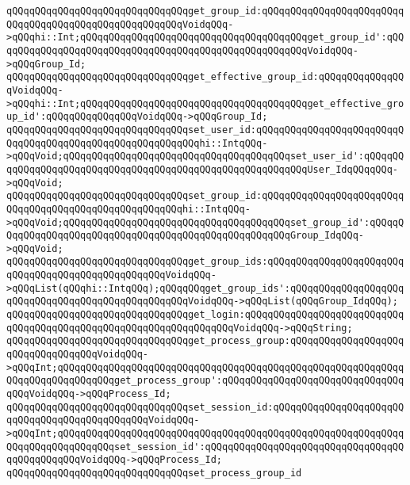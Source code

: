 \verb|qQQqqQQqqQQqqQQqqQQqqQQqqQQqqQQqget_group_id:qQQqqQQqqQQqqQQqqQQqqQQqqQQqqQQqqQQqqQQqqQQqqQQqqQQqqQQqVoidqQQq->qQQqhi::Int;qQQqqQQqqQQqqQQqqQQqqQQqqQQqqQQqqQQqqQQqget_group_id':qQQqqQQqqQQqqQQqqQQqqQQqqQQqqQQqqQQqqQQqqQQqqQQqqQQqqQQqVoidqQQq->qQQqGroup_Id;|\newline
\verb|qQQqqQQqqQQqqQQqqQQqqQQqqQQqqQQqget_effective_group_id:qQQqqQQqqQQqqQQqVoidqQQq->qQQqhi::Int;qQQqqQQqqQQqqQQqqQQqqQQqqQQqqQQqqQQqqQQqget_effective_group_id':qQQqqQQqqQQqqQQqVoidqQQq->qQQqGroup_Id;|\newline
\newline
\verb|qQQqqQQqqQQqqQQqqQQqqQQqqQQqqQQqset_user_id:qQQqqQQqqQQqqQQqqQQqqQQqqQQqqQQqqQQqqQQqqQQqqQQqqQQqqQQqqQQqhi::IntqQQq->qQQqVoid;qQQqqQQqqQQqqQQqqQQqqQQqqQQqqQQqqQQqqQQqset_user_id':qQQqqQQqqQQqqQQqqQQqqQQqqQQqqQQqqQQqqQQqqQQqqQQqqQQqqQQqqQQqUser_IdqQQqqQQq->qQQqVoid;|\newline
\verb|qQQqqQQqqQQqqQQqqQQqqQQqqQQqqQQqset_group_id:qQQqqQQqqQQqqQQqqQQqqQQqqQQqqQQqqQQqqQQqqQQqqQQqqQQqqQQqhi::IntqQQq->qQQqVoid;qQQqqQQqqQQqqQQqqQQqqQQqqQQqqQQqqQQqqQQqset_group_id':qQQqqQQqqQQqqQQqqQQqqQQqqQQqqQQqqQQqqQQqqQQqqQQqqQQqqQQqGroup_IdqQQq->qQQqVoid;|\newline
\newline
\verb|qQQqqQQqqQQqqQQqqQQqqQQqqQQqqQQqget_group_ids:qQQqqQQqqQQqqQQqqQQqqQQqqQQqqQQqqQQqqQQqqQQqqQQqqQQqVoidqQQq->qQQqList(qQQqhi::IntqQQq);qQQqqQQqget_group_ids':qQQqqQQqqQQqqQQqqQQqqQQqqQQqqQQqqQQqqQQqqQQqqQQqqQQqVoidqQQq->qQQqList(qQQqGroup_IdqQQq);|\newline
\newline
\verb|qQQqqQQqqQQqqQQqqQQqqQQqqQQqqQQqget_login:qQQqqQQqqQQqqQQqqQQqqQQqqQQqqQQqqQQqqQQqqQQqqQQqqQQqqQQqqQQqqQQqqQQqVoidqQQq->qQQqString;|\newline
\newline
\verb|qQQqqQQqqQQqqQQqqQQqqQQqqQQqqQQqget_process_group:qQQqqQQqqQQqqQQqqQQqqQQqqQQqqQQqqQQqVoidqQQq->qQQqInt;qQQqqQQqqQQqqQQqqQQqqQQqqQQqqQQqqQQqqQQqqQQqqQQqqQQqqQQqqQQqqQQqqQQqqQQqqQQqqQQqget_process_group':qQQqqQQqqQQqqQQqqQQqqQQqqQQqqQQqqQQqVoidqQQq->qQQqProcess_Id;|\newline
\verb|qQQqqQQqqQQqqQQqqQQqqQQqqQQqqQQqset_session_id:qQQqqQQqqQQqqQQqqQQqqQQqqQQqqQQqqQQqqQQqqQQqqQQqVoidqQQq->qQQqInt;qQQqqQQqqQQqqQQqqQQqqQQqqQQqqQQqqQQqqQQqqQQqqQQqqQQqqQQqqQQqqQQqqQQqqQQqqQQqqQQqset_session_id':qQQqqQQqqQQqqQQqqQQqqQQqqQQqqQQqqQQqqQQqqQQqqQQqVoidqQQq->qQQqProcess_Id;|\newline
\newline
\verb|qQQqqQQqqQQqqQQqqQQqqQQqqQQqqQQqset_process_group_id|\newline
